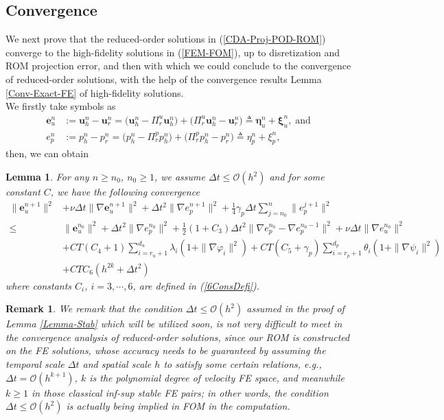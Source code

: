\documentclass[10pt,twoside,openany,UTF8,CJK]{article}
\newtheorem{Lemma}{Lemma}[section]
\newtheorem{Remark}{Remark}[section]
\begin{document}
	\subsection{Convergence}
	\indent We next prove that the reduced-order solutions in (\ref{CDA-Proj-POD-ROM}) converge to the high-fidelity solutions in (\ref{FEM-FOM}), up to disretization and ROM projection error, and then with which we could conclude to the convergence of reduced-order solutions, with the help of the convergence results Lemma \ref{Conv-Exact-FE} of high-fidelity solutions.  \\
	\indent We firstly take symbols as  
	$$
	\begin{aligned}
		\boldsymbol{e}^n_u &:= \boldsymbol{u}^n_h - \boldsymbol{u}^n_r = \Big(\boldsymbol{u}^n_h - \Pi^u_r\boldsymbol{u}^n_h\Big) + \Big(\Pi^u_r\boldsymbol{u}^n_h - \boldsymbol{u}^n_r\Big) \triangleq \boldsymbol{\eta}^n_u + \boldsymbol{\xi}^n_u, \;\text{and}	\\
		e^n_p &:= p^n_h - p^n_r = \Big(p^n_h - \Pi^p_rp^n_h\Big) + \Big(\Pi^p_rp^n_h - p^n_r\Big) \triangleq \eta^n_p + \xi^n_p,
	\end{aligned}
	$$
	then, we can obtain
	\begin{Lemma}\label{Conv-FE-POD}
		For any $n \geq n_0$, $n_0 \geq 1$, we assume $\Delta t \leq \mathcal{O}(h^2)$ and for some constant $C$, we have the following convergence
		\begin{equation}
			\begin{aligned}	
				\|\boldsymbol{e}^{n+1}_u\|^2 & + \nu\Delta t\|\nabla \boldsymbol{e}^{n+1}_u\|^2 + \Delta t^2\|\nabla e^{n+1}_p\|^2 + \frac14\gamma_p\Delta t\sum_{j=n_0}^{n}\|e^{j+1}_p\|^2 \\
				\leq & \|\boldsymbol{e}^{n_0}_u\|^2 + \Delta t^2\|\nabla e^{n_0}_p\|^2 + \frac12(1+C_3)\Delta t^2\|\nabla e^{n_0}_p - \nabla e^{n_0-1}_p\|^2  + \nu\Delta t\|\nabla e^{n_0}_u\|^2 \\
				&+ CT(C_4+1)\sum_{i=r_u+1}^{d_u}\lambda_i\left(1 + \|\nabla\varphi_i\|^2\right) + CT(C_5+\gamma_p)\sum_{i=r_p+1}^{d_p}\theta_i\left(1 + \|\nabla\psi_i\|^2\right) \\
				&+CTC_6\left(h^{2k} + \Delta t^2\right)
			\end{aligned}
		\end{equation}
	where constants $C_i$, $i=3,\cdots,6$, are defined in (\ref{6ConsDefi}).
	\end{Lemma}	
    
    \begin{Remark}
    	We remark that the condition $\Delta t \leq \mathcal{O}(h^2)$ assumed in the proof of Lemma \ref{Lemma-Stab} which will be utilized soon, is not very difficult to meet in the convergence analysis of reduced-order solutions, since our ROM is constructed on the FE solutions, whose accuracy needs to be guaranteed by assuming the temporal scale $\Delta t$ and spatial scale $h$ to satisfy some certain relations, e.g., $\Delta t=\mathcal{O}(h^{k+1})$, $k$ is the polynomial degree of velocity FE space, and meanwhile $k \geq 1$ in those classical inf-sup stable FE pairs; in other words, the condition $\Delta t \leq \mathcal{O}(h^2)$ is actually being implied in FOM in the computation.  
    \end{Remark}
     
\end{document}
